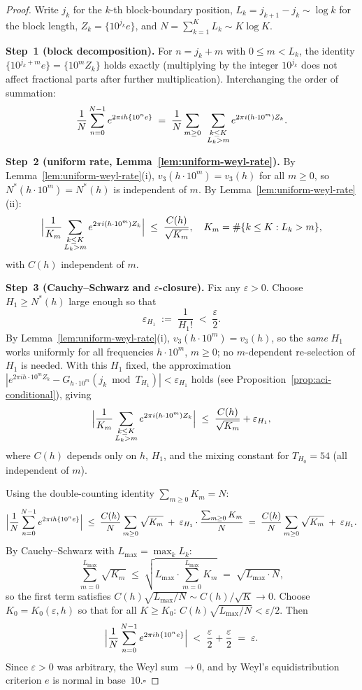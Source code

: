 \documentclass[
]{article}
\begin{document}
\begin{proof}
Write $j_k$ for the $k$-th block-boundary position,
$L_k=j_{k+1}-j_k\sim\log k$ for the block length,
$Z_k=\{10^{j_k}e\}$, and $N=\sum_{k=1}^KL_k\sim K\log K$.

\medskip\noindent\textbf{Step~1 (block decomposition).}
For $n=j_k+m$ with $0\le m<L_k$, the identity
$\{10^{j_k+m}e\}=\{10^mZ_k\}$ holds exactly (multiplying by the integer
$10^{j_k}$ does not affect fractional parts after further multiplication).
Interchanging the order of summation:
\[
  \frac{1}{N}\sum_{n=0}^{N-1}e^{2\pi ih\{10^ne\}}
  \;=\;
  \frac{1}{N}\sum_{m\ge 0}\;\sideset{}{}\sum_{\substack{k\le K\\L_k>m}}
  e^{2\pi i(h\cdot 10^m)Z_k}.
\]

\medskip\noindent\textbf{Step~2 (uniform rate, Lemma~\ref{lem:uniform-weyl-rate}).}
By Lemma~\ref{lem:uniform-weyl-rate}(i), $v_3(h\cdot 10^m)=v_3(h)$ for
all $m\ge 0$, so $N^*(h\cdot 10^m)=N^*(h)$ is independent of $m$.
By Lemma~\ref{lem:uniform-weyl-rate}(ii):
\[
  \Bigl|\frac{1}{K_m}\sideset{}{}\sum_{\substack{k\le K\\L_k>m}}
  e^{2\pi i(h\cdot 10^m)Z_k}\Bigr|
  \;\le\;\frac{C(h)}{\sqrt{K_m}},
  \quad K_m=\#\{k\le K:L_k>m\},
\]
with $C(h)$ independent of $m$.

\medskip\noindent\textbf{Step~3 (Cauchy--Schwarz and $\varepsilon$-closure).}
Fix any $\varepsilon>0$.  Choose $H_1\ge N^*(h)$ large enough so that
\[
  \varepsilon_{H_1} \;:=\; \frac{1}{H_1!} \;<\; \frac{\varepsilon}{2}.
\]
By Lemma~\ref{lem:uniform-weyl-rate}(i), $v_3(h\cdot 10^m)=v_3(h)$,
so the \emph{same} $H_1$ works uniformly for all frequencies $h\cdot 10^m$,
$m\ge 0$; no $m$-dependent re-selection of $H_1$ is needed.
With this $H_1$ fixed, the approximation $|e^{2\pi ih\cdot 10^m Z_k}
-G_{h\cdot 10^m}(j_k\bmod T_{H_1})|<\varepsilon_{H_1}$ holds
(see Proposition~\ref{prop:aci-conditional}), giving
\[
  \Bigl|\frac{1}{K_m}\sum_{\substack{k\le K\\L_k>m}}e^{2\pi i(h\cdot 10^m)Z_k}\Bigr|
  \;\le\;\frac{C(h)}{\sqrt{K_m}} + \varepsilon_{H_1},
\]
where $C(h)$ depends only on $h$, $H_1$, and the mixing constant for
$T_{H_0}=54$ (all independent of $m$).

Using the double-counting identity $\sum_{m\ge 0}K_m=N$:
\[
  \Bigl|\frac{1}{N}\sum_{n=0}^{N-1}e^{2\pi ih\{10^ne\}}\Bigr|
  \;\le\;
  \frac{C(h)}{N}\sum_{m\ge 0}\sqrt{K_m}
  \;+\;
  \varepsilon_{H_1}\cdot\frac{\sum_{m\ge 0}K_m}{N}
  \;=\;
  \frac{C(h)}{N}\sum_{m\ge 0}\sqrt{K_m}
  \;+\;\varepsilon_{H_1}.
\]
By Cauchy--Schwarz with $L_{\max}=\max_kL_k$:
\[
  \sum_{m=0}^{L_{\max}}\!\sqrt{K_m}
  \;\le\;\sqrt{L_{\max}\cdot\sum_{m=0}^{L_{\max}}K_m}
  \;=\;\sqrt{L_{\max}\cdot N},
\]
so the first term satisfies $C(h)\sqrt{L_{\max}/N}\sim C(h)/\sqrt{K}\to 0$.
Choose $K_0=K_0(\varepsilon,h)$ so that for all $K\ge K_0$:
$C(h)\sqrt{L_{\max}/N}<\varepsilon/2$.
Then
\[
  \Bigl|\frac{1}{N}\sum_{n=0}^{N-1}e^{2\pi ih\{10^ne\}}\Bigr|
  \;<\;\frac{\varepsilon}{2}+\frac{\varepsilon}{2}
  \;=\;\varepsilon.
\]
Since $\varepsilon>0$ was arbitrary, the Weyl sum $\to 0$, and
by Weyl's equidistribution criterion $e$ is normal in base~$10$.\hfill$\square$
\end{proof}
\end{document}
